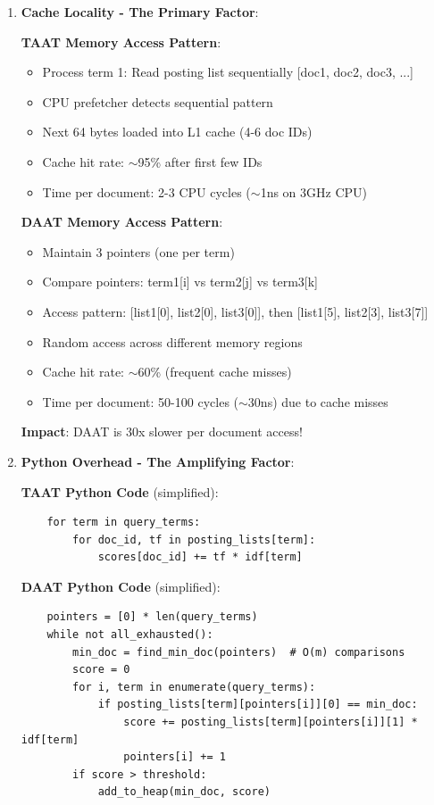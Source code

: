 \documentclass[12pt,a4paper]{article}
\begin{document}
\begin{enumerate}
    \item \textbf{Cache Locality - The Primary Factor}:
    
    \textbf{TAAT Memory Access Pattern}:
    \begin{itemize}
        \item Process term 1: Read posting list sequentially [doc1, doc2, doc3, ...]
        \item CPU prefetcher detects sequential pattern
        \item Next 64 bytes loaded into L1 cache (4-6 doc IDs)
        \item Cache hit rate: $\sim$95\% after first few IDs
        \item Time per document: 2-3 CPU cycles ($\sim$1ns on 3GHz CPU)
    \end{itemize}
    
    \textbf{DAAT Memory Access Pattern}:
    \begin{itemize}
        \item Maintain 3 pointers (one per term)
        \item Compare pointers: term1[i] vs term2[j] vs term3[k]
        \item Access pattern: [list1[0], list2[0], list3[0]], then [list1[5], list2[3], list3[7]]
        \item Random access across different memory regions
        \item Cache hit rate: $\sim$60\% (frequent cache misses)
        \item Time per document: 50-100 cycles ($\sim$30ns) due to cache misses
    \end{itemize}
    
    \textbf{Impact}: DAAT is 30x slower per document access!
    
    \item \textbf{Python Overhead - The Amplifying Factor}:
    
    \textbf{TAAT Python Code} (simplified):
    \begin{verbatim}
    for term in query_terms:
        for doc_id, tf in posting_lists[term]:
            scores[doc_id] += tf * idf[term]
    \end{verbatim}
    
    \textbf{DAAT Python Code} (simplified):
    \begin{verbatim}
    pointers = [0] * len(query_terms)
    while not all_exhausted():
        min_doc = find_min_doc(pointers)  # O(m) comparisons
        score = 0
        for i, term in enumerate(query_terms):
            if posting_lists[term][pointers[i]][0] == min_doc:
                score += posting_lists[term][pointers[i]][1] * idf[term]
                pointers[i] += 1
        if score > threshold:
            add_to_heap(min_doc, score)
    \end{verbatim}
    

\end{enumerate}
\end{document}

